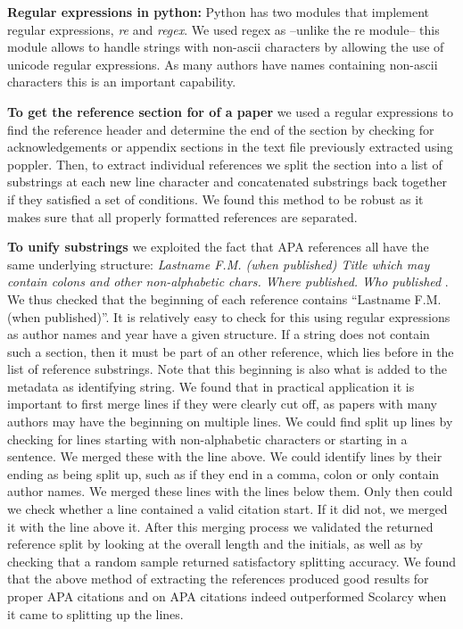 \documentclass[article,twocolumn]{IEEEtran}
\begin{document}
\textbf{Regular expressions in python:} Python has two modules that
implement regular expressions, \emph{re} and \emph{regex}. We used regex
as --unlike the re module-- this module allows to handle strings with
non-ascii characters by allowing the use of unicode regular expressions.
As many authors have names containing non-ascii characters this is an
important capability.

\textbf{To get the reference section for of a paper} we used a regular
expressions to find the reference header and determine the end of the
section by checking for acknowledgements or appendix sections in the
text file previously extracted using poppler. Then, to extract
individual references we split the section into a list of substrings at
each new line character and concatenated substrings back together if
they satisfied a set of conditions. We found this method to be robust as
it makes sure that all properly formatted references are separated.

\textbf{To unify substrings} we exploited the fact that APA references
all have the same underlying structure: \emph{Lastname F.M. (when
published) Title which may contain colons and other non-alphabetic
chars. Where published. Who published} \cite{apaformat}. We thus checked
that the beginning of each reference contains ``Lastname F.M. (when
published)''. It is relatively easy to check for this using regular
expressions as author names and year have a given structure. If a string
does not contain such a section, then it must be part of an other
reference, which lies before in the list of reference substrings. Note
that this beginning is also what is added to the metadata as identifying
string. We found that in practical application it is important to first
merge lines if they were clearly cut off, as papers with many authors
may have the beginning on multiple lines. We could find split up lines
by checking for lines starting with non-alphabetic characters or
starting in a sentence. We merged these with the line above. We could
identify lines by their ending as being split up, such as if they end in
a comma, colon or only contain author names. We merged these lines with
the lines below them. Only then could we check whether a line contained
a valid citation start. If it did not, we merged it with the line above
it. After this merging process we validated the returned reference split
by looking at the overall length and the initials, as well as by
checking that a random sample returned satisfactory splitting accuracy.
We found that the above method of extracting the references produced
good results for proper APA citations and on APA citations indeed
outperformed Scolarcy when it came to splitting up the lines.
\end{document}
